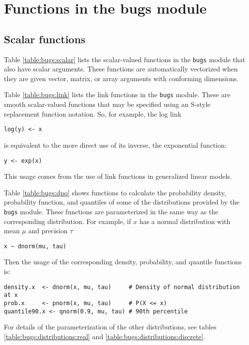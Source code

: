 \documentclass[11pt, a4paper, titlepage]{report}
\begin{document}
\section{Functions in the bugs module}
\label{section:functions:bugs}

\subsection{Scalar functions}

Table \ref{table:bugs:scalar} lists the scalar-valued functions in the
\texttt{bugs} module that also have scalar arguments.  These functions
are automatically vectorized when they are given vector, matrix, or
array arguments with conforming dimensions.

Table \ref{table:bugs:link} lists the link functions in the
\texttt{bugs} module.  These are smooth scalar-valued functions that
may be specified using an S-style replacement function notation. So,
for example, the log link
\begin{verbatim}
log(y) <- x
\end{verbatim}
is equivalent to the more direct use of its inverse, the exponential
function:
\begin{verbatim}
y <- exp(x)
\end{verbatim}
This usage comes from the use of link functions in generalized linear
models.

Table \ref{table:bugs:dpq} shows functions to calculate the
probability density, probability function, and quantiles of some of
the distributions provided by the \texttt{bugs} module. These
functions are parameterized in the same way as the corresponding
distribution.  For example, if $x$ has a normal distribution with mean
$\mu$ and precision $\tau$
\begin{verbatim}
x ~ dnorm(mu, tau)
\end{verbatim}
Then the usage of the corresponding density, probability, and quantile
functions is: 
\begin{verbatim}
density.x  <- dnorm(x, mu, tau)     # Density of normal distribution at x
prob.x     <- pnorm(x, mu, tau)     # P(X <= x)
quantile90.x <- qnorm(0.9, mu, tau) # 90th percentile
\end{verbatim}
For details of the parameterization of the other distributions, see
tables \ref{table:bugs:distributions:real} and
\ref{table:bugs:distributions:discrete}.
\end{document}
